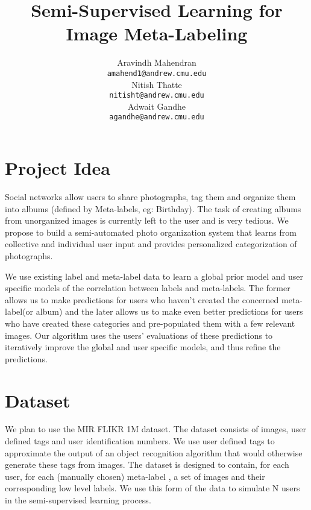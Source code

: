 \documentclass{article} %
\title{Semi-Supervised Learning for Image Meta-Labeling}
\author{
Aravindh Mahendran \\
\texttt{amahend1@andrew.cmu.edu} \\ 
\And
Nitish Thatte \\
\texttt{nitisht@andrew.cmu.edu} \\
\AND
Adwait Gandhe \\
\texttt{agandhe@andrew.cmu.edu} \\
}
\begin{document}
\maketitle
\vspace{-0.5in}
\section{Project Idea}
\vspace{-0.125in}
\label{sec:projidea}
Social networks allow users to share photographs, tag them and organize them into albums (defined by Meta-labels, eg: Birthday). The task of creating albums from unorganized images is currently left to the user and is very tedious. We propose to build a semi-automated photo organization system that learns from collective and individual user input and provides personalized categorization of photographs. 

We use existing label and meta-label data to learn a global prior model and user specific models of the correlation between labels and meta-labels. The former allows us to make predictions for users who haven't created the concerned meta-label(or album) and the later allows us to make even better predictions for users who have created these categories and pre-populated them with a few relevant images. Our algorithm uses the users' evaluations of these predictions to iteratively improve the global and user specific models, and thus refine the predictions.
\vspace{-0.125in}
\section{Dataset}
\vspace{-0.125in}
We plan to use the MIR FLIKR 1M dataset. The dataset consists of images, user defined tags and user identification numbers. 
We use user defined tags to approximate the output of an object recognition algorithm that would otherwise generate these tags from images.
The dataset is designed to contain, for each user, for each (manually chosen) meta-label , a set of images and their corresponding low level labels. We use this form of the data to simulate N users in the semi-supervised learning process. 
%
\vspace{-0.125in}
\end{document}
